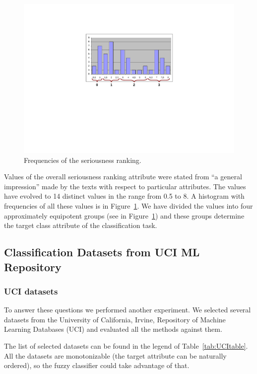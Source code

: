 \begin{figure}
\centerline{\includegraphics[angle=-90, width=0.6\hsize]{ranking_histogram}}
\caption{Frequencies of the seriousness ranking.}
\label{img:ch40_ranking_histogram}
\end{figure}

Values of the overall seriousness ranking attribute were stated from ``a general impression'' made by the texts with respect to particular attributes. %
The values have evolved to 14 distinct values in the range from 0.5 to 8. 
A histogram with frequencies of all these values is in Figure~\ref{img:ch40_ranking_histogram}.
We have divided the values into four approximately equipotent groups 
(see in Figure~\ref{img:ch40_ranking_histogram}) 
and these groups determine the target class attribute of the classification task. 






\subsection{Classification Datasets from UCI ML Repository} \label{sec:ch40_uci_datasets}
\subsubsection{UCI datasets}

To answer these questions we performed another experiment. We selected several datasets from the University of California, Irvine, Repository of Machine Learning Databases (UCI) \citep{biblio:UCI} and evaluated all the methods against them. 



The list of selected datasets can be found in the legend of Table~\ref{tab:UCItable}. All the datasets are monotonizable (the target attribute can be naturally ordered), so the fuzzy classifier could take advantage of that.


